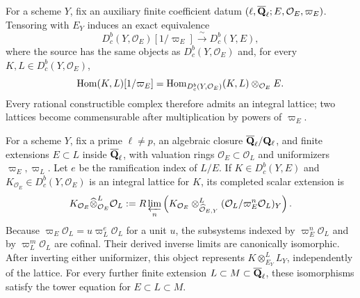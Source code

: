
\begin{theorem}
\label{thm:rational-lattice-localization}


For a scheme \(Y\), fix an auxiliary finite coefficient datum
\((\ell,\overline{\mathbf Q}_\ell;E,\mathcal O_E,\varpi_E)\).
Tensoring with \(E_Y\) induces an exact equivalence
\[
 D^b_c(Y,\mathcal O_E)[1/\varpi_E]
 \xrightarrow{\ \sim\ }D^b_c(Y,E),
\]
where the source has the same objects as \(D^b_c(Y,\mathcal O_E)\) and,
for every \(K,L\in D^b_c(Y,\mathcal O_E)\),
\[
 \operatorname{Hom}(K,L)[1/\varpi_E]
 =\operatorname{Hom}_{D^b_c(Y,\mathcal O_E)}(K,L)
   \otimes_{\mathcal O_E}E.
\]
Every rational constructible complex therefore admits an integral lattice;
two lattices become commensurable after multiplication by powers of
\(\varpi_E\).
\end{theorem}


\begin{proposition}
\label{prop:ramified-coefficient-change}


For a scheme \(Y\), fix a prime \(\ell\neq p\), an algebraic closure
\(\overline{\mathbf Q}_\ell/\mathbf Q_{\ell}\), and finite extensions \(E\subset L\) inside \(\overline{\mathbf Q}_\ell\), with
valuation rings \(\mathcal O_E\subset\mathcal O_L\) and uniformizers
\(\varpi_E,\varpi_L\).  Let \(e\) be the ramification index of \(L/E\).  If
\(K\in D^b_c(Y,E)\) and
\(K_{\mathcal O_E}\in D^b_c(Y,\mathcal O_E)\) is an integral lattice for
\(K\), its completed scalar
extension is
\[
 K_{\mathcal O_E}\widehat\otimes^L_{\mathcal O_E}\mathcal O_L
 :=R\varprojlim_n\left(
 K_{\mathcal O_E}\otimes^L_{\widehat{\mathcal O}_{E,Y}}
 (\mathcal O_L/\varpi_E^n\mathcal O_L)_Y\right).
\]
Because \(\varpi_E\mathcal O_L=u\varpi_L^e\mathcal O_L\) for a unit
\(u\), the subsystems indexed by \(\varpi_E^n\mathcal O_L\) and by
\(\varpi_L^m\mathcal O_L\) are cofinal.  Their derived inverse limits are
canonically isomorphic.  After inverting either uniformizer, this object
represents \(K\otimes^L_{E_Y}L_Y\), independently of the lattice.  For
every further finite extension \(L\subset M\subset\overline{\mathbf Q}_\ell\), these
isomorphisms satisfy the tower equation for \(E\subset L\subset M\).
\end{proposition}

